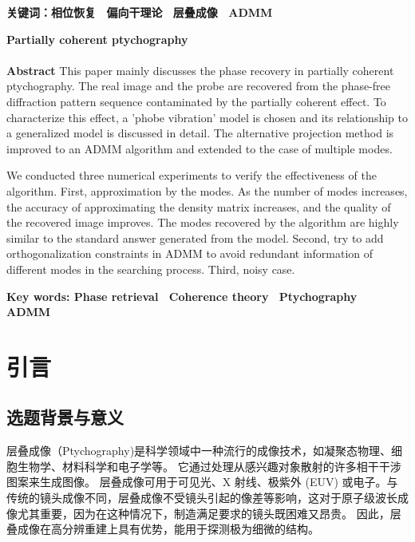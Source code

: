 \documentclass[12pt]{article}
\begin{document}
	\textbf{关键词：相位恢复~  偏向干理论~ 层叠成像~ ADMM}
	
	\newpage
	\thispagestyle{empty}
	\begin{center}
		\large \textbf{Partially coherent ptychography} ~\\ ~\\
		\normalsize \textbf{Abstract}
		This paper mainly discusses the phase recovery in partially coherent ptychography. The real image and the probe are recovered from the phase-free diffraction pattern sequence contaminated by the partially coherent effect. To characterize this effect, a 'phobe vibration' model is chosen and its relationship to a generalized model is discussed in detail. The alternative projection method is improved to an ADMM algorithm and extended to the case of multiple modes.
		
		We conducted three numerical experiments to verify the effectiveness of the algorithm. First, approximation by the modes. As the number of modes increases, the accuracy of approximating the density matrix increases, and the quality of the recovered image improves. The modes recovered by the algorithm are highly similar to the standard answer generated from the model. Second, try to add orthogonalization constraints in ADMM to avoid redundant information of different modes in the searching process. Third, noisy case.
	\end{center}
	

	\textbf{Key words: Phase retrieval~  Coherence theory~ Ptychography~ ADMM}
	
	\newpage
	\thispagestyle{empty}
	\tableofcontents
	
	\newpage
	\thispagestyle{empty}
	\listoffigures
	
	\listoftables
	
	\newpage
	\setcounter{page}{1}
	\section{引言}
	
	\subsection{选题背景与意义}

	
	层叠成像（Ptychography)是科学领域中一种流行的成像技术，如凝聚态物理、细胞生物学、材料科学和电子学等。 它通过处理从感兴趣对象散射的许多相干干涉图案来生成图像。 层叠成像可用于可见光、X 射线、极紫外 (EUV) 或电子。与传统的镜头成像不同，层叠成像不受镜头引起的像差等影响，这对于原子级波长成像尤其重要，因为在这种情况下，制造满足要求的镜头既困难又昂贵。 因此，层叠成像在高分辨重建上具有优势，能用于探测极为细微的结构。
	
\end{document}
